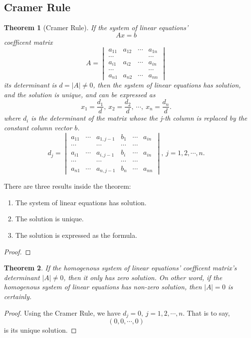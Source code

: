 \documentclass{article}
\newtheorem{theorem}{Theorem}[section]
\theoremstyle{definition}
\begin{document}
\subsection{Cramer Rule}
\begin{theorem}[Cramer Rule]

    If the system of linear equations' 
    $$Ax=b$$
    coefficent matrix 
    $$
    A=
    \begin{vmatrix}
        a_{11} & a_{12} & \cdots & a_{1n}\\
        \cdots &  &  & \cdots\\
        a_{i1} & a_{i2} & \cdots & a_{in}\\
        \cdots &  &  & \cdots\\
        a_{n1} & a_{n2} & \cdots & a_{nn}
    \end{vmatrix}
    $$
    its determinant is $d = |A| \neq 0$, then the system of 
    linear equations has solution, and the solution is unique, and can be expressed as 
    $$x_{1}=\frac{d_{1}}{d},\ x_{2}=\frac{d_{2}}{d},\ \cdots,\ x_{n}=\frac{d_{n}}{d}.$$
    where $d_{i}$ is the determinant of the matrix whose the j-th column is replaced by 
    the constant column vector $b$.
    $$d_{j}=
    \begin{vmatrix}
        a_{11} & \cdots & a_{1,j-1} & b_{1} &\cdots & a_{in}\\
        \cdots &  & \cdots & \cdots & \cdots\\
        a_{i1} & \cdots & a_{i,j-1} & b_{i} &\cdots & a_{in}\\
        \cdots &  & \cdots & \cdots & \cdots\\
        a_{n1} & \cdots & a_{n,j-1} & b_{n} &\cdots & a_{nn}
    \end{vmatrix}
    ,\ j=1,2,\cdots,n.$$
\end{theorem}
There are three results inside the theorem:
\begin{enumerate}
    \item The system of linear equations has solution.
    \item The solution is unique.
    \item The solution is expressed as the formula.
\end{enumerate}

\begin{proof}
\end{proof}

\begin{theorem}
    If the homogenous system of linear equations' coefficent matrix's 
    determinant $|A|\neq 0$, then it only has zero solution. On other word, if 
    the homogenous system of linear equations has non-zero solution, then $|A|=0$ is certainly.
\end{theorem}
\begin{proof}
    Using the Cramer Rule, we have $d_{j}=0,\ j=1,2,\cdots,n$. That is to say,
    $$(0,0,\cdots,0)$$ is its unique solution.
\end{proof}
\end{document}
